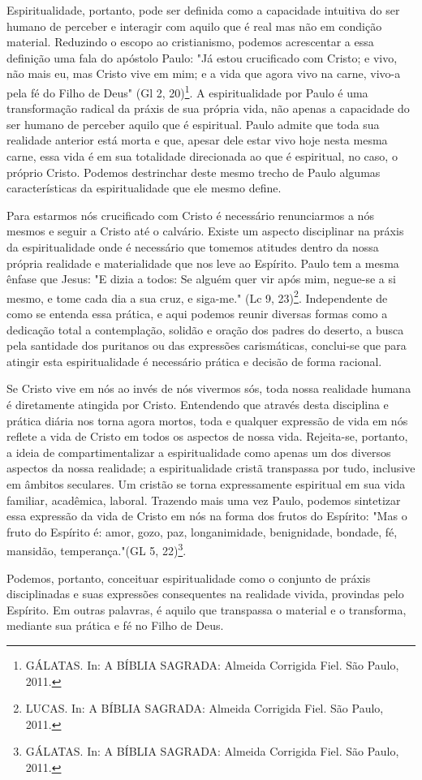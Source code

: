 \documentclass[
    article,            %
	12pt,				%
	oneside,			%
	a4paper,			%
	chapter=TITLE,		%
	section=TITLE,		%
	english,			%
	french,				%
	spanish,			%
	brazil				%
	]{abntex2}
\begin{document}
Espiritualidade, portanto, pode ser definida como a capacidade intuitiva do ser humano de perceber e interagir com aquilo que é real mas não em condição material. Reduzindo o escopo ao cristianismo, podemos acrescentar a essa definição uma fala do apóstolo Paulo: "Já estou crucificado com Cristo; e vivo, não mais eu, mas Cristo vive em mim; e a vida que agora vivo na carne, vivo-a pela fé do Filho de Deus" (Gl 2, 20)\footnote{GÁLATAS. In: A BÍBLIA SAGRADA: Almeida Corrigida Fiel. São Paulo, 2011.}. A espiritualidade por Paulo é uma transformação radical da práxis de sua própria vida, não apenas a capacidade do ser humano de perceber aquilo que é espiritual. Paulo admite que toda sua realidade anterior está morta e que, apesar dele estar vivo hoje nesta mesma carne, essa vida é em sua totalidade direcionada ao que é espiritual, no caso, o próprio Cristo. Podemos destrinchar deste mesmo trecho de Paulo algumas características da espiritualidade que ele mesmo define.

Para estarmos nós crucificado com Cristo é necessário renunciarmos a nós mesmos e seguir a Cristo até o calvário. Existe um aspecto disciplinar na práxis da espiritualidade onde é necessário que tomemos atitudes dentro da nossa própria realidade e materialidade que nos leve ao Espírito. Paulo tem a mesma ênfase que Jesus: "E dizia a todos: Se alguém quer vir após mim, negue-se a si mesmo, e tome cada dia a sua cruz, e siga-me." (Lc 9, 23)\footnote{LUCAS. In: A BÍBLIA SAGRADA: Almeida Corrigida Fiel. São Paulo, 2011.}. Independente de como se entenda essa prática, e aqui podemos reunir diversas formas como a dedicação total a contemplação, solidão e oração dos padres do deserto, a busca pela santidade dos puritanos ou das expressões carismáticas, conclui-se que para atingir esta espiritualidade é necessário prática e decisão de forma racional.

Se Cristo vive em nós ao invés de nós vivermos sós, toda nossa realidade humana é diretamente atingida por Cristo. Entendendo que através desta disciplina e prática diária nos torna agora mortos, toda e qualquer expressão de vida em nós reflete a vida de Cristo em todos os aspectos de nossa vida. Rejeita-se, portanto, a ideia de compartimentalizar a espiritualidade como apenas um dos diversos aspectos da nossa realidade; a espiritualidade cristã transpassa por tudo, inclusive em âmbitos seculares. Um cristão se torna expressamente espiritual em sua vida familiar, acadêmica, laboral. Trazendo mais uma vez Paulo, podemos sintetizar essa expressão da vida de Cristo em nós na forma dos frutos do Espírito: "Mas o fruto do Espírito é: amor, gozo, paz, longanimidade, benignidade, bondade, fé, mansidão, temperança."(GL 5, 22)\footnote{GÁLATAS. In: A BÍBLIA SAGRADA: Almeida Corrigida Fiel. São Paulo, 2011.}.

Podemos, portanto, conceituar espiritualidade como o conjunto de práxis disciplinadas e suas expressões consequentes na realidade vivida, provindas pelo Espírito. Em outras palavras, é aquilo que transpassa o material e o transforma, mediante sua prática e fé no Filho de Deus.

% 
\end{document}
